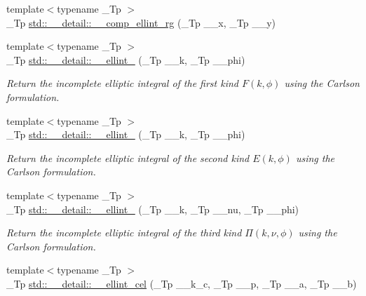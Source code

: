 \begin{DoxyCompactItemize}
\item 
{\footnotesize template$<$typename \+\_\+\+Tp $>$ }\\\+\_\+\+Tp \hyperlink{namespacestd_1_1____detail_a31bb5a6e359c88b5bece8dd73f76a2f9}{std\+::\+\_\+\+\_\+detail\+::\+\_\+\+\_\+comp\+\_\+ellint\+\_\+rg} (\+\_\+\+Tp \+\_\+\+\_\+x, \+\_\+\+Tp \+\_\+\+\_\+y)
\item 
{\footnotesize template$<$typename \+\_\+\+Tp $>$ }\\\+\_\+\+Tp \hyperlink{namespacestd_1_1____detail_aa349fe5bcf36d29cfacf6cd3e8aa65b0}{std\+::\+\_\+\+\_\+detail\+::\+\_\+\+\_\+ellint\+\_} (\+\_\+\+Tp \+\_\+\+\_\+k, \+\_\+\+Tp \+\_\+\+\_\+phi)
\begin{DoxyCompactList}\small\item\em Return the incomplete elliptic integral of the first kind $ F(k,\phi) $ using the Carlson formulation. \end{DoxyCompactList}\item 
{\footnotesize template$<$typename \+\_\+\+Tp $>$ }\\\+\_\+\+Tp \hyperlink{namespacestd_1_1____detail_ad3687a38e74e5fbf08265501add0b56a}{std\+::\+\_\+\+\_\+detail\+::\+\_\+\+\_\+ellint\+\_} (\+\_\+\+Tp \+\_\+\+\_\+k, \+\_\+\+Tp \+\_\+\+\_\+phi)
\begin{DoxyCompactList}\small\item\em Return the incomplete elliptic integral of the second kind $ E(k,\phi) $ using the Carlson formulation. \end{DoxyCompactList}\item 
{\footnotesize template$<$typename \+\_\+\+Tp $>$ }\\\+\_\+\+Tp \hyperlink{namespacestd_1_1____detail_a9c6ea96cd5d6907fce278010b992499a}{std\+::\+\_\+\+\_\+detail\+::\+\_\+\+\_\+ellint\+\_} (\+\_\+\+Tp \+\_\+\+\_\+k, \+\_\+\+Tp \+\_\+\+\_\+nu, \+\_\+\+Tp \+\_\+\+\_\+phi)
\begin{DoxyCompactList}\small\item\em Return the incomplete elliptic integral of the third kind $ \Pi(k,\nu,\phi) $ using the Carlson formulation. \end{DoxyCompactList}\item 
{\footnotesize template$<$typename \+\_\+\+Tp $>$ }\\\+\_\+\+Tp \hyperlink{namespacestd_1_1____detail_a7c7d04715f0d40e054299312db35e32d}{std\+::\+\_\+\+\_\+detail\+::\+\_\+\+\_\+ellint\+\_\+cel} (\+\_\+\+Tp \+\_\+\+\_\+k\+\_\+c, \+\_\+\+Tp \+\_\+\+\_\+p, \+\_\+\+Tp \+\_\+\+\_\+a, \+\_\+\+Tp \+\_\+\+\_\+b)

\end{DoxyCompactItemize}
